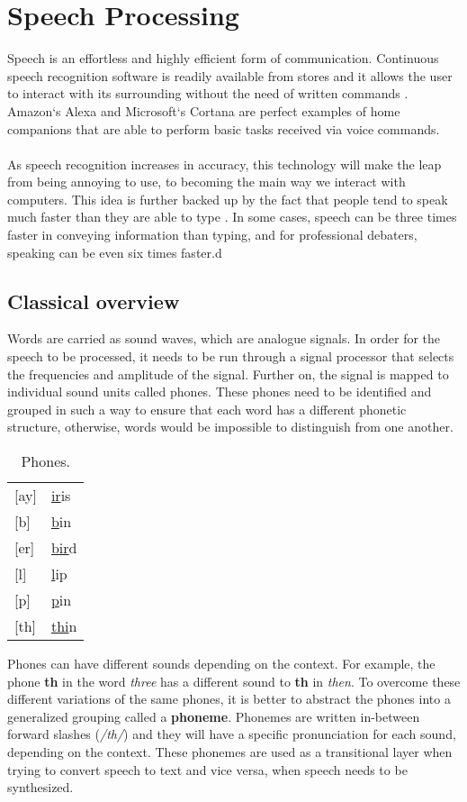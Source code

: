 \chapter{Speech Processing}\label{ch:speech_processing}
Speech is an effortless and highly efficient form of communication.
Continuous speech recognition software is readily available from stores and it allows the user to interact with its surrounding without the need of written commands
\cite[p.~396]{callan2003artificial}. Amazon`s Alexa 
\cite{Alexa} and Microsoft`s Cortana 
\cite{Cortana} are perfect examples of home companions that are able to perform basic tasks received via voice commands.\\\\
As speech recognition increases in accuracy, this technology will make the leap from being annoying to use, to becoming the main way we interact with computers. 
This idea is further backed up by the fact that people tend to speak much faster than they are able to type \cite{Speed}.
In some cases, speech can be three times faster in conveying information than typing, and for professional debaters,
speaking can be even six times faster.d

\section{Classical overview}
Words are carried as sound waves, which are analogue signals.
In order for the speech to be processed,
it needs to be run through a signal processor that selects the frequencies and amplitude of the signal.
Further on, the signal is mapped to individual sound units called phones.
These phones need to be identified and grouped in such a way to ensure that each word has a different phonetic structure,
otherwise, words would be impossible to distinguish from one another.
\begin{table}[H]
\centering
	\caption{Phones.}
	\label{my-label}
	\begin{tabular}{l l}
		{[}ay{]} & \underline{ir}is \\
		{[}b{]}  & \underline{b}in  \\
		{[}er{]} & \underline{bir}d \\
		{[}l{]}  & \underline{l}ip  \\
		{[}p{]}  & \underline{p}in  \\
		{[}th{]} & \underline{thi}n
	\end{tabular}
\end{table}
Phones can have different sounds depending on the context. 
For example, the phone \textbf{th} in the word \textit{three} has a different sound to \textbf{th} in \textit{then}. 
To overcome these different variations of the same phones, 
it is better to abstract the phones into a generalized grouping called a \textbf{phoneme}.
Phonemes are written in-between forward slashes
(\textit{/th/}) and they will have a specific pronunciation for each sound, depending on the context.
These phonemes are used as a transitional layer when trying to convert speech to text and vice versa,
when speech needs to be synthesized.

